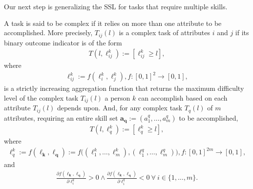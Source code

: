 \documentclass[hidelinks, nonatbib]{elsarticle}
\begin{document}
Our next step is generalizing the SSL for tasks that require multiple skills.
\begin{definition}
    \label{complex_task}
    A task is said to be complex if it relies on more than one attribute to be accomplished. More precisely, $T_{ij}(l)$ is a complex task of attributes $i$ and $j$ if its binary outcome indicator is of the form
    \begin{gather}
        T(l, \ell_{ij}^{k})
        :=
        [\ell_{ij}^{k} \geq l],
    \end{gather}
    where
    \begin{gather}
        \ell_{ij}^{k}
        :=
        f(\ell_{i}^{k}, \ell_{j}^{k})
        ,
        f
        :
        [0,1]^2
        \rightarrow
        [0,1]
        ,
    \end{gather}
    is a strictly increasing aggregation function that returns the maximum difficulty level of the complex task $T_{ij}(l)$ a person $k$ can accomplish based on each attribute $T_{ij}(l)$ depends upon. And, for any complex task $T_{q}(l)$ of $m$ attributes, requiring an entire skill set $\boldsymbol{a_q} := (a_{1}^{q}, \dots, a_{m}^{q})$ to be accomplished, 
    \begin{gather}
        T(l, \ell_{q}^{k})
        :=
        [\ell_{q}^{k} \geq l],
    \end{gather}
    where
    \begin{gather}
        \ell_{q}^{k}
        := 
        f(\boldsymbol{\ell_k}, \boldsymbol{\ell_q})
        :=
        f\big(
            (\ell_{1}^{k}, \dots, \ell_{m}^{k})
            ,
            (\ell_{1}^{q}, \dots, \ell_{m}^{q})
        \big)
        ,
        f
        :
        [0,1]^{2m}
        \rightarrow
        [0,1]
        ,
    \end{gather}
    and 
    \begin{gather}
        \frac{
            \partial
            f(\boldsymbol{\ell_k}, \boldsymbol{\ell_q})
        }{
            \partial 
            \ell_{i}^{k}
        } > 0
        \land
        \frac{
            \partial
            f(\boldsymbol{\ell_k}, \boldsymbol{\ell_q})
        }{
            \partial 
            \ell_{i}^{q}
        } < 0
        \
        \forall 
        \
        i \in \{1, \dots, m\}
        .
    \end{gather}
        

\end{definition}
\end{document}
